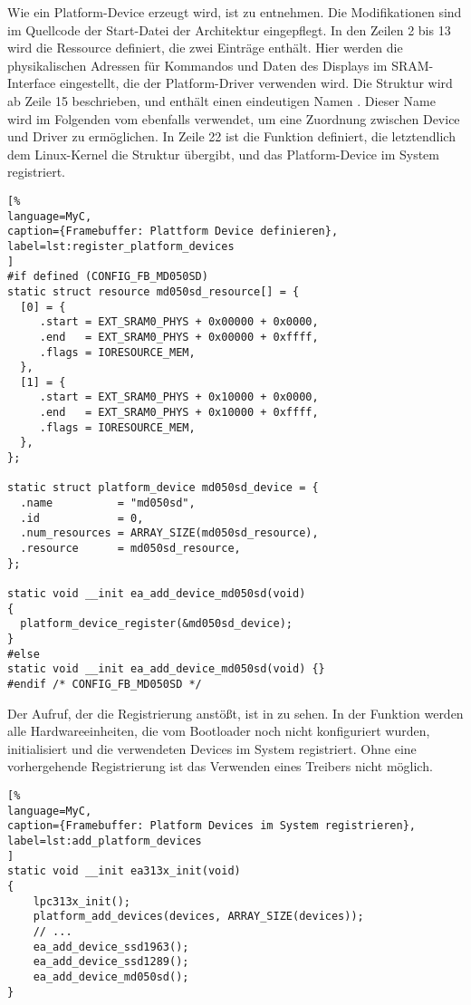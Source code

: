 Wie ein Platform-Device erzeugt wird, ist  zu entnehmen. Die Modifikationen sind im Quellcode der Start-Datei der Architektur  eingepflegt. In den Zeilen 2 bis 13 wird die Ressource  definiert, die zwei Einträge enthält. Hier werden die physikalischen Adressen für Kommandos und Daten des Displays im SRAM-Interface eingestellt, die der Platform-Driver verwenden wird. Die Struktur  wird ab Zeile 15 beschrieben, und enthält einen eindeutigen Namen . Dieser Name wird im Folgenden vom  ebenfalls verwendet, um eine Zuordnung zwischen Device und Driver zu ermöglichen.
In Zeile 22 ist die Funktion definiert, die letztendlich dem Linux-Kernel die Struktur  übergibt, und das Platform-Device im System registriert. 
\begin{lstlisting}[%
language=MyC,
caption={Framebuffer: Plattform Device definieren},
label=lst:register_platform_devices
]
#if defined (CONFIG_FB_MD050SD)
static struct resource md050sd_resource[] = {
  [0] = {
     .start = EXT_SRAM0_PHYS + 0x00000 + 0x0000,
     .end   = EXT_SRAM0_PHYS + 0x00000 + 0xffff,
     .flags = IORESOURCE_MEM,
  },
  [1] = {
     .start = EXT_SRAM0_PHYS + 0x10000 + 0x0000,
     .end   = EXT_SRAM0_PHYS + 0x10000 + 0xffff,
     .flags = IORESOURCE_MEM,
  },
};

static struct platform_device md050sd_device = {
  .name          = "md050sd",
  .id            = 0,
  .num_resources = ARRAY_SIZE(md050sd_resource),
  .resource      = md050sd_resource,
};

static void __init ea_add_device_md050sd(void)
{
  platform_device_register(&md050sd_device);
}
#else
static void __init ea_add_device_md050sd(void) {}
#endif /* CONFIG_FB_MD050SD */
\end{lstlisting}
Der Aufruf, der die Registrierung anstößt, ist in  zu sehen. In der Funktion  werden alle Hardwareeinheiten, die vom Bootloader noch nicht konfiguriert wurden, initialisiert und die verwendeten Devices im System registriert. Ohne eine vorhergehende Registrierung ist das Verwenden eines Treibers nicht möglich.

\begin{lstlisting}[%
language=MyC,
caption={Framebuffer: Platform Devices im System registrieren},
label=lst:add_platform_devices
]
static void __init ea313x_init(void)
{
	lpc313x_init();
	platform_add_devices(devices, ARRAY_SIZE(devices));
    // ...
	ea_add_device_ssd1963();
	ea_add_device_ssd1289();
	ea_add_device_md050sd();
}
\end{lstlisting}

